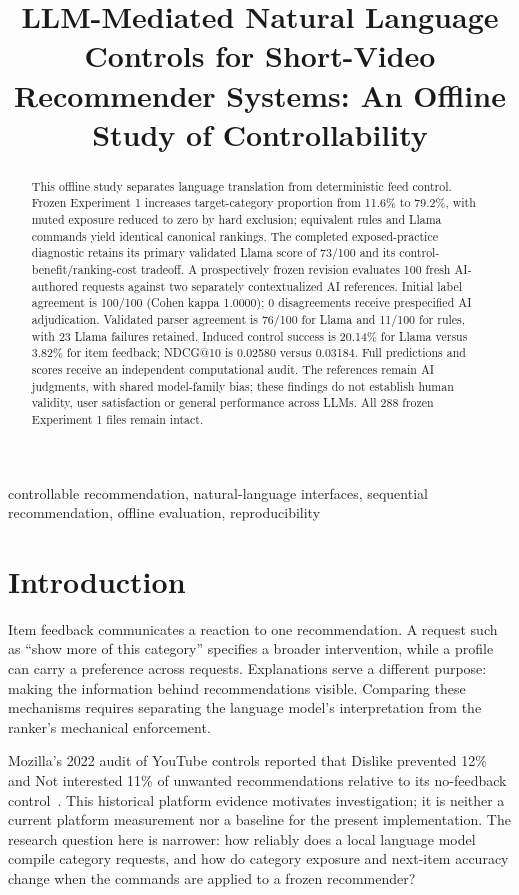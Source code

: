 \documentclass[conference]{IEEEtran}
\title{LLM-Mediated Natural Language Controls for Short-Video Recommender Systems: An Offline Study of Controllability}
\author{\IEEEauthorblockN{Vibhor Malik}\IEEEauthorblockA{M.Sc. in Applied Computing\\British Columbia Institute of Technology\\Supervisor: Borna Noureddin\\COMP 9500 research project\\Review draft: 14 October 2026, Vancouver time}}
\begin{document}
\maketitle
\thispagestyle{plain}\pagestyle{plain}
\begin{abstract}
This offline study separates language translation from deterministic feed control. Frozen Experiment 1 increases target-category proportion from 11.6\% to 79.2\%, with muted exposure reduced to zero by hard exclusion; equivalent rules and Llama commands yield identical canonical rankings. The completed exposed-practice diagnostic retains its primary validated Llama score of 73/100 and its control-benefit/ranking-cost tradeoff. A prospectively frozen revision evaluates 100 fresh AI-authored requests against two separately contextualized AI references. Initial label agreement is 100/100 (Cohen kappa 1.0000); 0 disagreements receive prespecified AI adjudication. Validated parser agreement is 76/100 for Llama and 11/100 for rules, with 23 Llama failures retained. Induced control success is 20.14\% for Llama versus 3.82\% for item feedback; NDCG@10 is 0.02580 versus 0.03184. Full predictions and scores receive an independent computational audit. The references remain AI judgments, with shared model-family bias; these findings do not establish human validity, user satisfaction or general performance across LLMs. All 288 frozen Experiment 1 files remain intact.
\end{abstract}
\begin{IEEEkeywords}
controllable recommendation, natural-language interfaces, sequential recommendation, offline evaluation, reproducibility
\end{IEEEkeywords}

\section{Introduction}
Item feedback communicates a reaction to one recommendation. A request such as ``show more of this category'' specifies a broader intervention, while a profile can carry a preference across requests. Explanations serve a different purpose: making the information behind recommendations visible. Comparing these mechanisms requires separating the language model's interpretation from the ranker's mechanical enforcement.

Mozilla's 2022 audit of YouTube controls reported that Dislike prevented 12\% and Not interested 11\% of unwanted recommendations relative to its no-feedback control~\cite{ricks2022button}. This historical platform evidence motivates investigation; it is neither a current platform measurement nor a baseline for the present implementation. The research question here is narrower: how reliably does a local language model compile category requests, and how do category exposure and next-item accuracy change when the commands are applied to a frozen recommender?
\end{document}
